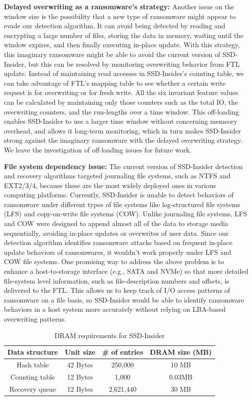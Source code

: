 \documentclass[conference]{IEEEtran}
\newcommand{\ours}{SSD-Insider}
\begin{document}
{\bf Delayed overwriting as a ransomware's strategy:}
Another issue on the window size is the possibility that a new type
of ransomware might appear to evade our detection algorithm. It can
avoid being detected by reading and encrypting  a large number of
files, storing the data in memory, waiting until the window
expires, and then finally executing in-place update.  With this
strategy, this imaginary ransomware might be able to avoid the
current version of \ours{}, but this can be resolved by monitoring
overwriting behavior from FTL update.  Instead of maintaining read
accesses in \ours{}'s counting table, we can take advantage of
FTL's mapping table to see whether a certain write request is for
overwriting or for fresh write.  All the six invariant feature
values can be calculated by maintaining only those counters such as
the total IO, the overwriting counters, and the run-lengths over a
time window.  This off-loading enables \ours{} to use a larger time
window without concerning memeory overhead, and allows it long-term
monitoring, which in turn makes \ours{} strong against the
imaginary ransomware with the delayed overwriting strategy. We
leave the investigation of off-loading issues for future work.

{\bf File system dependency issue:} 
The current version of \ours{} detection and recovery algorithms
targeted journaling file systems, such as NTFS and EXT2/3/4,
because these are the most widely deployed ones in various
computing platforms. Currently, \ours{} is unable to detect
behaviors of ransomware under different types of file systems like
log-structured file systems (LFS) and copy-on-write file systems
(COW).  Unlike journaling file systems, LFS and COW were designed
to append almost all of the data to storage media sequentially,
avoiding in-place updates or overwrites of user data.  Since our
detection algorithm identifies ransomware attacks based on frequent
in-place update behaviors of ransomwares, it wouldn't work properly
under LFS and COW file systems. One promising way to address the
above problem is to enhance a host-to-storage interface (e.g., SATA
and NVMe) so that more detailed file-system level information, such
as file-description numbers and offsets, is delivered to the FTL.
This allows us to keep track of I/O access patterns of ransomware
on a file basis, so \ours{} would be able to identify ransomware
behaviors in a host system more accurately without relying on
LBA-based overwriting patterns.

\begin{table}[t]
	\centering
	\caption{DRAM requirements for \ours{}}
	\begin{tabular}{c|c|c|c}
		\hline
		Data structure   	& Unit size & \# of entries & DRAM size (MB) \\
		\hline
		\hline
		Hash table 			& 42 Bytes 	& 250,000 		& 10 MB \\ 
		Counting table		& 12 Bytes 	& 1,000 		& 0.03MB \\ 
		Recovery queue		& 12 Bytes 	& 2,621,440 	&  30 MB \\ 
		\hline
	\end{tabular}
	\label{tab:size_summary}
\end{table}
\end{document}
